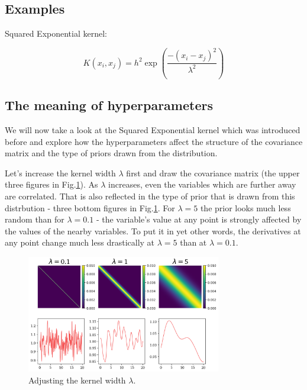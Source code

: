 \documentclass[10pt,twocolumn]{article}
\newcommand\pythonstyle{\lstset{
language=Python,
basicstyle=\ttm,
otherkeywords={self},             %
keywordstyle=\ttb\color{deepblue},
emph={MyClass,__init__},          %
emphstyle=\ttb\color{deepred},    %
stringstyle=\color{deepgreen},
frame=tb,                         %
showstringspaces=false            %
}}
\newcommand\pythoninline[1]{{\pythonstyle\lstinline!#1!}}
\begin{document}

\subsection{Examples}

Squared Exponential kernel:

\begin{equation}
K(x_i, x_j) = h^2 \exp(\frac{- (x_i - x_j)^2}{\lambda^2})
\end{equation}


\subsection{The meaning of hyperparameters} \label{sec:meaning-of-hyp}

We will now take a look at the Squared Exponential kernel which was introduced before and explore how the hyperparameters affect the structure of the covariance matrix and the type of priors drawn from the distribution.


Let's increase the kernel width $\lambda$ first and draw the covariance matrix (the upper three figures in Fig.\ref{fig:SE-kernel-width}). As $\lambda$ increases, even the variables which are further away are correlated. That is also reflected in the type of prior that is drawn from this distrbution - three bottom figures in Fig.\ref{fig:SE-kernel-width}. For $\lambda = 5$ the prior looks much less random than for $\lambda = 0.1$ - the variable's value at any point is strongly affected by the values of the nearby variables. To put it in yet other words, the derivatives at any point change much less drastically at $\lambda = 5$ than at $\lambda = 0.1$.

\begin{figure}[H]
\centering\includegraphics[width=8.5cm]{cov-Kernel-SE-changing-lambda-tex.png}
\caption{Adjusting the kernel width $\lambda$.}
\label{fig:SE-kernel-width}
\end{figure}
\end{document}
